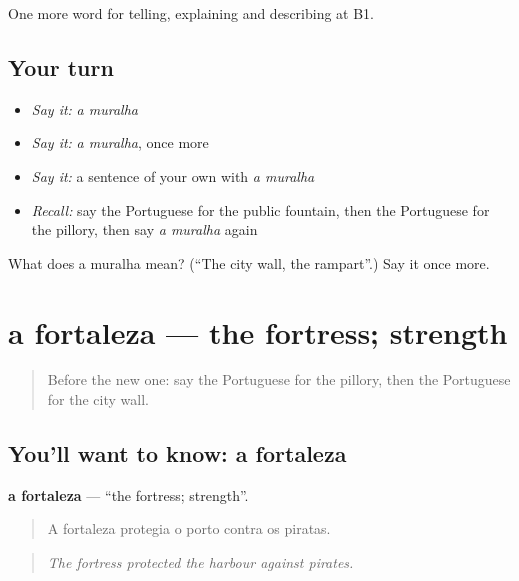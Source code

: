 \begin{grammarlens}[title={What you've built}]
One more word for telling, explaining and describing at B1.
\end{grammarlens}

\subsection*{Your turn}
\begin{itemize}
\raggedright
  \item \emph{Say it:} \emph{a muralha}
  \item \emph{Say it:} \emph{a muralha}, once more
  \item \emph{Say it:} a sentence of your own with \emph{a muralha}
  \item \emph{Recall:} say the Portuguese for the public fountain, then the Portuguese for the pillory, then say \emph{a muralha} again
\end{itemize}

\begin{tcolorbox}[breakable,colback=teal!4,colframe=teal!35!black,title={Before you move on}]
What does a muralha mean? (\textquotedblleft{}The city wall, the rampart\textquotedblright{}.) Say it once more.
\end{tcolorbox}
\section[a fortaleza]{a fortaleza — the fortress; strength}

\label{lesson:PT-C442-fortaleza}



\begin{quote}
Before the new one: say the Portuguese for the pillory, then the Portuguese for the city wall.
\end{quote}

\subsection*{You'll want to know: a fortaleza}
\textbf{a fortaleza} — \textquotedblleft{}the fortress; strength\textquotedblright{}.

\begin{quote}
A fortaleza protegia o porto contra os piratas.
\end{quote}

\begin{quote}
\emph{The fortress protected the harbour against pirates.}
\end{quote}


